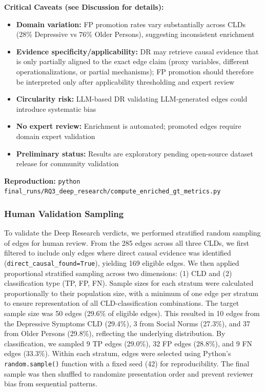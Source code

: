 \textbf{Critical Caveats (see Discussion for details):}
\begin{itemize}[noitemsep]
    \item \textbf{Domain variation:} FP promotion rates vary substantially across CLDs (28\% Depressive vs 76\% Older Persons), suggesting inconsistent enrichment
    \item \textbf{Evidence specificity/applicability:} DR may retrieve causal evidence that is only partially aligned to the exact edge claim (proxy variables, different operationalizations, or partial mechanisms); FP promotion should therefore be interpreted only after applicability thresholding and expert review
    \item \textbf{Circularity risk:} LLM-based DR validating LLM-generated edges could introduce systematic bias
    \item \textbf{No expert review:} Enrichment is automated; promoted edges require domain expert validation
    \item \textbf{Preliminary status:} Results are exploratory pending open-source dataset release for community validation
\end{itemize}

\textbf{Reproduction:} \texttt{python final\_runs/RQ3\_deep\_research/compute\_enriched\_gt\_metrics.py}

\subsubsection{Human Validation Sampling}
\label{sec:rq3_human_validation}

To validate the Deep Research verdicts, we performed stratified random sampling of edges for human review. From the 285 edges across all three CLDs, we first filtered to include only edges where direct causal evidence was identified (\texttt{direct\_causal\_found=True}), yielding 169 eligible edges. We then applied proportional stratified sampling across two dimensions: (1) CLD and (2) classification type (TP, FP, FN). Sample sizes for each stratum were calculated proportionally to their population size, with a minimum of one edge per stratum to ensure representation of all CLD-classification combinations. The target sample size was 50 edges (29.6\% of eligible edges). This resulted in 10 edges from the Depressive Symptoms CLD (29.4\%), 3 from Social Norms (27.3\%), and 37 from Older Persons (29.8\%), reflecting the underlying distribution. By classification, we sampled 9 TP edges (29.0\%), 32 FP edges (28.8\%), and 9 FN edges (33.3\%). Within each stratum, edges were selected using Python's \texttt{random.sample()} function with a fixed seed (42) for reproducibility. The final sample was then shuffled to randomize presentation order and prevent reviewer bias from sequential patterns.

